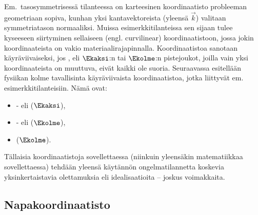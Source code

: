 Em.\ tasosymmetrisessä tilanteessa on karteesinen koordinaatisto probleeman 
geometriaan sopiva, kunhan yksi kantavektoreista (yleensä $\vec k$) valitaan symmetriatason
normaaliksi. Muissa esimerkkitilanteissa sen sijaan tulee kyseeseen siirtyminen sellaiseen 
 (engl. curvilinear) koordinaatistoon, jossa jokin koordinaateista on vakio 
materiaalirajapinnalla. Koordinaatistoa sanotaan käyräviivaiseksi, jos ,
eli $\Ekaksi$:n tai $\Ekolme$:n pistejoukot, joilla vain yksi koordinaateista on muuttuva, eivät
kaikki ole suoria. Seuraavassa esitellään fysiikan kolme tavallisinta käyräviivaista 
koordinaatistoa, jotka liittyvät em. esimerkkitilanteisiin. Nämä ovat:
\begin{itemize}
\item  {}- eli  ($\Ekaksi$),
\item  {}- eli  ($\Ekolme$),
\item  {} ($\Ekolme$).
\end{itemize}
Tällaisia koordinaatistoja sovellettaessa (niinkuin yleensäkin matematiikkaa sovellettaessa) 
tehdään yleensä käytännön ongelmatilannetta koskevia yksinkertaistavia olettamuksia eli 
idealisaatioita -- joskus voimakkaita.

\subsection*{Napakoordinaatisto}

